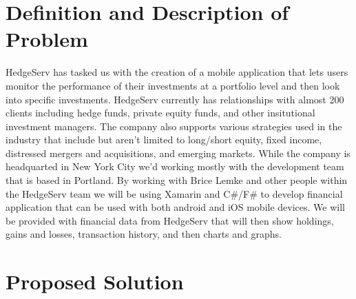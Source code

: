 \documentclass[onecolumn, draftclsnofoot,10pt, compsoc]{IEEEtran}
\begin{document}
\section{Definition and Description of Problem}

HedgeServ has tasked us with the creation of a mobile application that lets users monitor the performance of their investments at a portfolio level and then look into specific investments. HedgeServ currently has relationships with almost 200 clients including hedge funds, private equity funds, and other insitutional investment managers. The company also supports various strategies used in the industry that include but aren't limited to long/short equity, fixed income, distressed mergers and acquisitions, and emerging markets. While the company is headquarted in New York City we'd working mostly with the development team that is based in Portland. By working with Brice Lemke and other people within the HedgeServ team we will be using Xamarin and C#/F# to develop financial application that can be used with both android and iOS mobile devices. We will be provided with financial data from HedgeServ that will then show holdings, gains and losses, transaction history, and then charts and graphs. 

\section{Proposed Solution}
\end{document}
